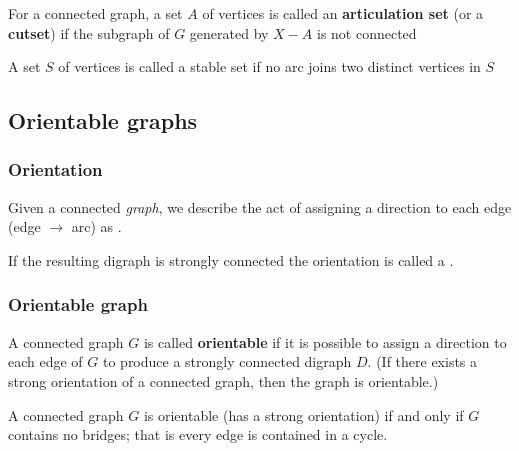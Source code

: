 \documentclass[aspectratio=169]{beamer}
\begin{document}
\begin{frame} 
	\begin{definition}
		For a connected graph, a set $A$ of vertices is called an \textbf{articulation set} (or a \textbf{cutset}) if the subgraph of $G$ generated by $X-A$ is not connected
	\end{definition}
	\vfill
	\begin{definition}
		A set $S$ of vertices is called a stable set if no arc joins two distinct vertices in $S$
	\end{definition}
	\vfill
\end{frame}




\subsection{Orientable graphs}
\begin{frame}\frametitle{Orientation}
\begin{definition}
Given a connected \emph{graph}, we describe the act of assigning a direction to each edge (edge $\rightarrow$ arc) as .
\end{definition}
\begin{definition}
If the resulting digraph is strongly connected the orientation is called a .
\end{definition}
\end{frame}
 
 
\begin{frame}\frametitle{Orientable graph}
\begin{definition}
A connected graph $G$ is called \textbf{orientable} if it is possible to assign a direction to each edge of $G$ to produce a strongly connected digraph $D$.
(If there exists a strong orientation of a connected graph, then the graph is orientable.)
\end{definition}

\begin{theorem}
A connected graph $G$ is orientable (has a strong orientation) if and only if $G$ contains no bridges; that is every edge is contained in a cycle.
\end{theorem}
\end{frame}
 
\end{document}
